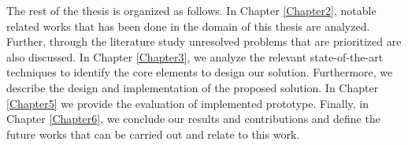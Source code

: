 The rest of the thesis is organized as follows. In Chapter \ref{Chapter2}, notable related works that has been done in the domain of this thesis are analyzed. Further, through the literature study unresolved problems that are prioritized are also discussed. In Chapter \ref{Chapter3}, we analyze the relevant state-of-the-art techniques to identify the core elements to design our solution. Furthermore, we describe the design and implementation of the proposed solution. In Chapter \ref{Chapter5}  we provide the evaluation of implemented prototype. Finally, in Chapter \ref{Chapter6}, we conclude our results and contributions and define the future works that can be carried out and relate to this work. 




